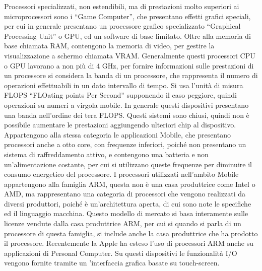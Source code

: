 \documentclass{article}
\numberwithin{equation}{subsection}
\begin{document}
Processori specializzati, non estendibili, ma di prestazioni molto superiori ai microprocessori sono i ``Game Computer'', che presentano effetti grafici speciali, per cui 
in generale presentano un processore grafico specializzato ``Graphical Processing Unit'' o GPU, ed un software di base limitato. Oltre alla memoria di base chiamata RAM, contengono la memoria di video, per gestire 
la visualizzazione a schermo chiamata VRAM. Generalmente questi processori CPU o GPU lavorano a non più di 4 GHz, per fornire informazioni sulle prestazioni di un processore 
si considera la banda di un processore, che rappresenta il numero di operazioni effettuabili in un dato intervallo di tempo. Si usa l'unità di misura FLOPS ``FLOating points Per Second'' 
supponendo il caso peggiore, quindi operazioni su numeri a virgola mobile. In generale questi dispositivi presentano una banda nell'ordine dei tera FLOPS. 
Questi sistemi sono chiusi, quindi non è possibile aumentare le prestazioni aggiungendo ulteriori chip al dispositivo. 
Appartengono alla stessa categoria le applicazioni Mobile, che presentano processori anche a otto core, con frequenze inferiori, poiché non presentano un sistema di raffreddamento 
attivo, e contengono una batteria e non un'alimentazione costante, per cui si utilizzano queste frequenze per diminuire il consumo energetico del processore. I processori 
utilizzati nell'ambito Mobile appartengono alla famiglia ARM, questa non è una casa produttrice come Intel o AMD, ma rappresentano una categoria di processori che vengono 
realizzati da diversi produttori, poiché è un'architettura aperta, di cui sono note le specifiche ed il linguaggio macchina. Questo modello di mercato si basa interamente sulle 
licenze vendute dalla casa produttrice ARM, per cui si quando si parla di un processore di questa famiglia, si include anche la casa produttrice che ha prodotto il processore. 
Recentemente la Apple ha esteso l'uso di processori ARM anche su applicazioni di Personal Computer. Su questi dispositivi le funzionalità I/O vengono fornite tramite un 
'interfaccia grafica basate su touch-screen. 
\end{document}
